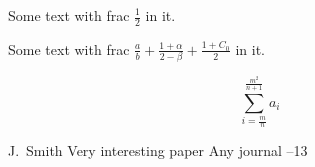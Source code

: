 \documentclass{article}
\begin{document}

\author{Author's Name}

Some text with frac $\frac{1}{2}$ in it.

Some text with frac $\frac{a}{b}+\frac{1+\alpha}{2-\beta}+\frac{1+C_0}{2}$ in it.

$$
\sum_{i=\frac{m}{n}}^{\frac{m^2}{n+1}} a_i
$$

\begin{thebibliography}{99}
\by J.~Smith
\paper Very interesting paper
\jour Any journal
--13
\end{thebibliography}
\end{document}
